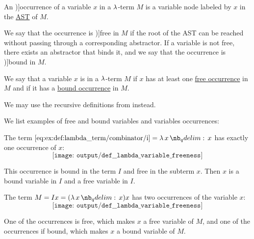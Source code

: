 \begin{definition}\label{def:lambda_variable_occurrence}\mimprovised
  An \term[ru=вхождение (\cite[64]{Герасимов2011})]{occurrence} of a variable \( x \) in a \( \mathrm{\lambda} \)-term \( M \) is a variable node labeled by \( x \) in the \hyperref[def:lambda_term_ast]{AST} of \( M \).

  We say that the occurrence is \term[ru=свободное (вхождение) (\cite[64]{Герасимов2011})]{free} in \( M \) if the root of the AST can be reached without passing through a corresponding abstractor. If a variable is not free, there exists an abstractor that binds it, and we say that the occurrence is \term[ru=связанное (вхождение) (\cite[64]{Герасимов2011})]{bound} in \( M \).
\end{definition}

\begin{definition}\label{def:lambda_variable_freeness}\mimprovised
  We say that a variable \( x \) is  in a \( \mathrm{\lambda} \)-term \( M \) if \( x \) has at least one \hyperref[def:lambda_variable_occurrence]{free occurrence} in \( M \) and  if it has a \hyperref[def:lambda_variable_occurrence]{bound occurrence} in \( M \).
\end{definition}
\begin{comments}
  \item We may use the recursive definitions from  instead.
\end{comments}

\begin{example}\label{ex:def:lambda_variable_freeness}
  We list examples of free and bound variables and variables occurrences:
  \begin{thmenum}
     The term \( \ref{eq:ex:def:lambda_term/combinator/i} = \qabs x x \) has exactly one occurrence of \( x \):
    \begin{equation*}
      \texttt{[image: output/def\_\_lambda\_variable\_freeness]}
    \end{equation*}

     This occurrence is bound in the term \( I \) and free in the subterm \( x \). Then \( x \) is a bound variable in \( I \) and a free variable in \( I \).

     The term \( M = I x = (\qabs x x) x \) has two occurrences of the variable \( x \):
    \begin{equation*}
      \texttt{[image: output/def\_\_lambda\_variable\_freeness]}
    \end{equation*}

    One of the occurrences is free, which makes \( x \) a free variable of \( M \), and one of the occurrences if bound, which makes \( x \) a bound variable of \( M \).
  \end{thmenum}
\end{example}

